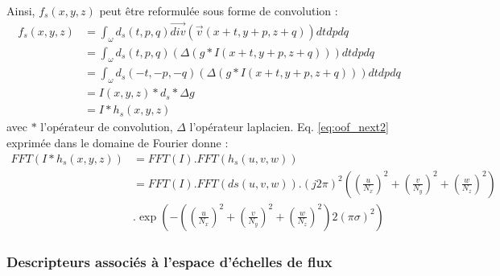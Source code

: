   Ainsi, $f_s(x,y,z)$ peut être reformulée sous forme de convolution :
  \begin{align}
    f_s(x,y,z) & = \int_{\omega} d_s(t,p,q) \vec{div}( \vec{v}(x+t,y+p, z+q) ) dtdpdq \\
    \nonumber
               & = \int_{\omega} d_s(t,p,q) (\Delta(g*I(x+t,y+p, z+q))) dtdpdq \\
               & = \int_{\omega} d_s(-t,-p,-q) (\Delta(g*I(x+t,y+p, z+q))) dtdpdq \\
               & = I(x,y,z) * d_s * \Delta g \\
               & = I * h_s(x,y,z)
    \label{eq:oof_next2}
  \end{align}
  avec $*$ l'opérateur de convolution, $\Delta$ l'opérateur laplacien.
  Eq. \ref{eq:oof_next2} exprimée dans le domaine de Fourier donne :
  \begin{align}
    FFT( I * h_s(x,y,z) ) &= FFT(I) . FFT(h_s(u,v,w)) \\
                          &= FFT(I) . FFT(ds(u,v,w)) . (j2 \pi)^2 ( (\frac{u}{N_x})^2 + (\frac{v}{N_y})^2 + (\frac{w}{N_z})^2 )  \\
                          & .  \exp( -( (\frac{u}{N_x})^2 + (\frac{v}{N_y})^2 + (\frac{w}{N_z})^2 ) 2(\pi\sigma)^2 )
  \end{align}
\subsubsection{Descripteurs associés à l'espace d'échelles de flux}


